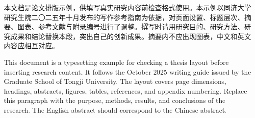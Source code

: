 \makeatletter
{}
\def\tongji@cheadingtitlenew{\tongji@posttitle}
\makeatother

\begin{cabstract}
本文档是论文排版示例，供填写真实研究内容前检查格式使用。本示例以同济大学研究生院二〇二五年十月发布的写作参考指南为依据，对页面设置、标题层次、摘要、图表、参考文献与附录编号进行了调整。撰写时请用研究目的、研究方法、研究成果和结论替换本段，突出自己的创新成果。摘要内不应出现图表，中文和英文内容应相互对应。
\end{cabstract}

\begin{eabstract}
This document is a typesetting example for checking a thesis layout before inserting research content. It follows the October 2025 writing guide issued by the Graduate School of Tongji University. The layout covers page dimensions, headings, abstracts, figures, tables, references, and appendix numbering. Replace this paragraph with the purpose, methods, results, and conclusions of the research. The English abstract should correspond to the Chinese abstract.
\end{eabstract}
